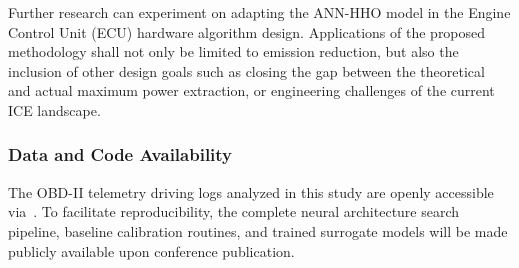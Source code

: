 \documentclass[runningheads]{llncs}
\begin{document}
Further research can experiment on adapting the ANN-HHO model in the Engine Control Unit (ECU)
hardware algorithm design. Applications of the proposed methodology shall not only be limited to
emission reduction, but also the inclusion of other design goals such as closing the gap between the
theoretical and actual maximum power extraction, or engineering challenges of the current ICE
landscape.

\subsubsection*{Data and Code Availability}
The OBD-II telemetry driving logs analyzed in this study are openly accessible via~\cite{cephasax_obdii_ds3}.
To facilitate reproducibility, the complete neural architecture search pipeline, baseline calibration
routines, and trained surrogate models will be made publicly available upon conference publication.



\end{document}
